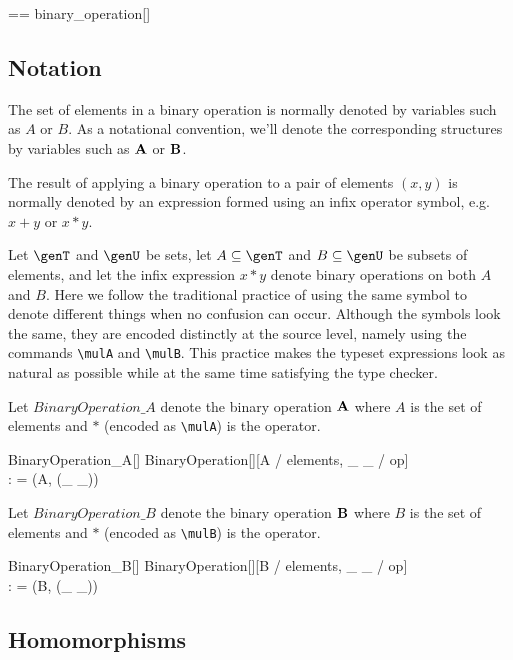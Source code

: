 \documentclass{amsart}
\begin{document}
\begin{zed}
	\binop \genT == binary\_operation[\genT]
\end{zed}

\subsection{Notation}

The set of elements in a binary operation is normally denoted by variables such as $A$ or $B$.
As a notational convention, we'll denote the corresponding structures by variables such as $\mathbf{A}$ or $\mathbf{B}$.

The result of applying a binary operation to a pair of elements $(x, y)$ 
is normally denoted by an expression formed using an infix operator symbol,
e.g. $x + y$ or $x * y$.

Let $\genT$ and $\genU$ be sets, 
let $A \subseteq \genT$ and $B \subseteq \genU$ be subsets of elements,
and let the infix expression $x * y$ denote binary operations on both $A$ and $B$.
Here we follow the traditional practice of using the same symbol to denote different things when no confusion can occur.
Although the symbols look the same, they are encoded distinctly at the source level,
namely using the commands \verb|\mulA| and \verb|\mulB|.
This practice makes the typeset expressions look as natural as possible while at the same time satisfying the type checker.

Let $BinaryOperation\_A$ denote the binary operation $\mathbf{A}$ where $A$ is the set of elements and $*$ (encoded as \verb|\mulA|) is the operator.
\begin{schema}{BinaryOperation\_A}[\genT]
	BinaryOperation[\genT][A / elements, \_ \mulA \_ / op] \\
	\strucA: \binop \genT
\where
	\strucA = (A, (\_ \mulA \_))
\end{schema}

Let $BinaryOperation\_B$ denote the binary operation $\mathbf{B}$ where $B$ is the set of elements and $*$ (encoded as \verb|\mulB|) is the operator.
\begin{schema}{BinaryOperation\_B}[\genU]
	BinaryOperation[\genU][B / elements, \_ \mulB \_ / op] \\
	\strucB: \binop \genU
\where
	\strucB = (B, (\_ \mulB \_))
\end{schema}

\subsection{Homomorphisms}
\end{document}
